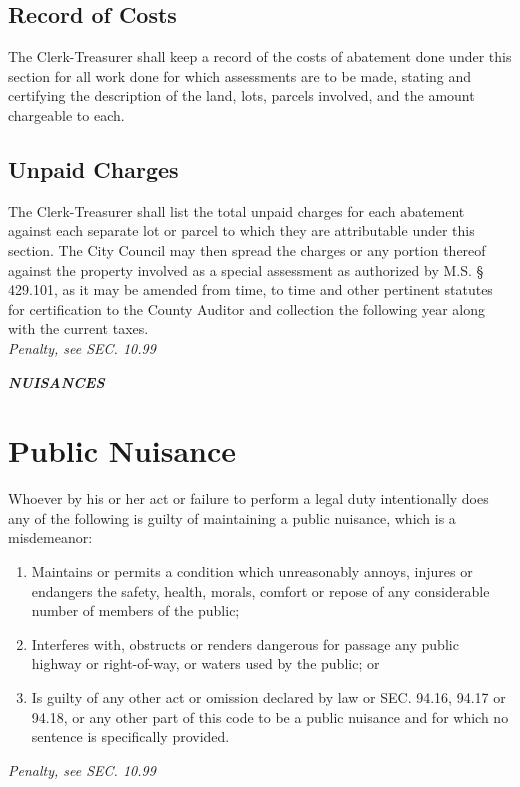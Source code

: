 \subsection{Record of Costs}
The Clerk-Treasurer shall keep a record of the costs of abatement done under this section for all work done for which assessments are to be made, stating and certifying the description of the land, lots, parcels involved, and the amount chargeable to each.
\subsection{Unpaid Charges}
The Clerk-Treasurer shall list the total unpaid charges for each abatement against each separate lot or parcel to which they are attributable under this section. The City Council may then spread the charges or any portion thereof against the property involved as a special assessment as authorized by M.S. § 429.101, as it may be amended from time, to time and other pertinent statutes for certification to the County Auditor and collection the following year along with the current taxes.\\
\emph{Penalty, see SEC. 10.99}


\begin{center}
\emph{\textbf{\LARGE{NUISANCES}}}
\end{center}
\setcounter{section}{14}
\section{Public Nuisance}
Whoever by his or her act or failure to perform a legal duty intentionally does any of the following is guilty of maintaining a public nuisance, which is a misdemeanor:
\begin{enumerate}[{\indent}A)]
    \item Maintains or permits a condition which unreasonably annoys, injures or endangers the safety, health, morals, comfort or repose of any considerable number of members of the public;
    \item Interferes with, obstructs or renders dangerous for passage any public highway or right-of-way, or waters used by the public; or
    \item Is guilty of any other act or omission declared by law or SEC. 94.16, 94.17 or 94.18, or any other part of this code to be a public nuisance and for which no sentence is specifically provided.
\end{enumerate}
\emph{Penalty, see SEC. 10.99}

